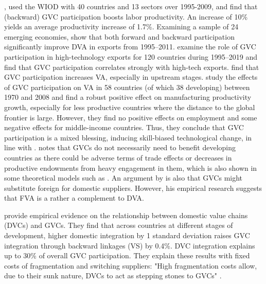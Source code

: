 \documentclass[a4paper]{article}
\begin{document}
\citet{constantinescu2019does}, used the WIOD with 40 countries and 13 sectors over 1995-2009, and find that (backward) GVC participation boosts labor productivity. An increase of 10\% yields an average productivity increase of 1.7\%. Examining a sample of 24 emerging economies, \citet{jangam2021does} show that both forward and backward participation significantly improve DVA in exports from 1995–2011. \citet{altun2023does} examine the role of GVC participation in high-technology exports for 120 countries during 1995–2019 and find that GVC participation correlates strongly with high-tech exports. \citet{kummritz2017economic} find that GVC participation increases VA, especially in upstream stages. \citet{pahl2020global} study the effects of GVC participation on VA in 58 countries (of which 38 developing) between 1970 and 2008 and find a robust positive effect on manufacturing productivity growth, especially for less productive countries where the distance to the global frontier is large. However, they find no positive effects on employment and some negative effects for middle-income countries. Thus, they conclude that GVC participation is a mixed blessing, inducing skill-biased technological change, in line with \citet{rodrik2018new}. \citet{Kummritz20161} notes that GVCs do not necessarily need to benefit developing countries as there could be adverse terms of trade effects or decreases in productive endowments from heavy engagement in them, which is also shown in some theoretical models such as \citet{baldwin2014trade}. An argument by \citet{kummritz2015global} is also that GVCs might substitute foreign for domestic suppliers. However, his empirical research suggests that FVA is a rather a complement to DVA. \newline   

 \citet{beverelli2019domestic} provide empirical evidence on the relationship between domestic value chains (DVCs) and GVCs. They find that across countries at different stages of development, higher domestic integration by 1 standard deviation raises GVC integration through backward linkages (VS) by 0.4\%. DVC integration explains up to 30\% of overall GVC participation. They explain these results with fixed costs of fragmentation and switching suppliers: "High fragmentation costs allow, due to their sunk nature, DVCs to act as stepping stones to GVCs" \citep{beverelli2019domestic}. \newline 
 
\end{document}
